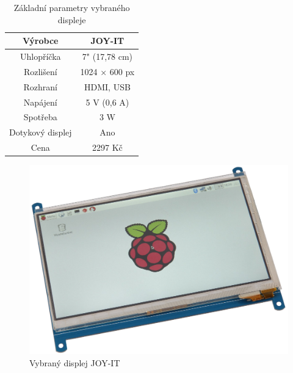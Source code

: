 \begin{table}[!h]
    \centering
    \begin{tabular}{|c|c|}
        \hline
        Výrobce                                                         & JOY-IT   \\ \hline
        Uhlopříčka                                                      & 7" (17,78 cm)  \\ \hline
        Rozlišení                                                        & 1024 × 600 px    \\ \hline
         Rozhraní 
            & HDMI, USB \\ \hline
        Napájení & 5 V (0,6 A) \\ \hline
        Spotřeba & 3 W \\ \hline
        Dotykový displej                                                        & Ano     \\ \hline
        Cena                                                            & 2297 Kč     \\ \hline
    \end{tabular}
    \caption{Základní parametry vybraného displeje}
    \label{displeej}
\end{table}



\begin{figure}[!h]
    \begin{center}
        \includegraphics[scale=0.22]{obrazky/Displej.png}
    \end{center}
    \caption{Vybraný displej JOY-IT \cite{displej}}
\end{figure}



